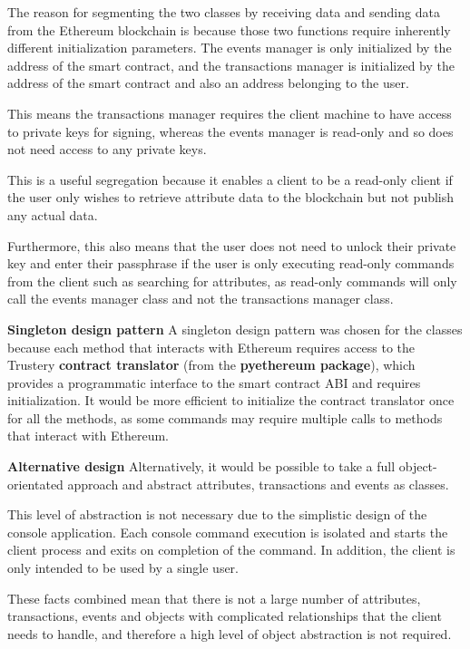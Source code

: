 \documentclass[12pt,a4paper]{report}
\begin{document}
	The reason for segmenting the two classes by receiving data and sending data from the Ethereum blockchain is because those two functions require inherently different initialization parameters. The events manager is only initialized by the address of the smart contract, and the transactions manager is initialized by the address of the smart contract and also an address belonging to the user.
	
	This means the transactions manager requires the client machine to have access to private keys for signing, whereas the events manager is read-only and so does not need access to any private keys.
	
	This is a useful segregation because it enables a client to be a read-only client if the user only wishes to retrieve attribute data to the blockchain but not publish any actual data.
	
	Furthermore, this also means that the user does not need to unlock their private key and enter their passphrase if the user is only executing read-only commands from the client such as searching for attributes, as read-only commands will only call the events manager class and not the transactions manager class.
	
	\bigskip
	\noindent \textbf{Singleton design pattern}\newline
	A singleton design pattern was chosen for the classes because each method that interacts with Ethereum requires access to the Trustery \textbf{contract translator} (from the \textbf{pyethereum package}), which provides a programmatic interface to the smart contract ABI and requires initialization. It would be more efficient to initialize the contract translator once for all the methods, as some commands may require multiple calls to methods that interact with Ethereum.
	
	\bigskip
	\noindent \textbf{Alternative design}\newline
	Alternatively, it would be possible to take a full object-orientated approach and abstract attributes, transactions and events as classes.
	
	This level of abstraction is not necessary due to the simplistic design of the console application. Each console command execution is isolated and starts the client process and exits on completion of the command. In addition, the client is only intended to be used by a single user.
	
	These facts combined mean that there is not a large number of attributes, transactions, events and objects with complicated relationships that the client needs to handle, and therefore a high level of object abstraction is not required.
	
\end{document}
